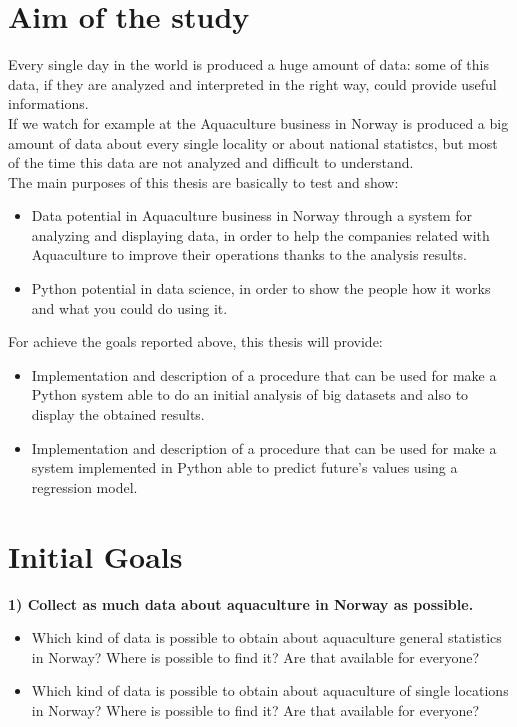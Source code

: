 


\section{Aim of the study}
Every single day in the world is produced a huge amount of data: some of this data, if they are analyzed and interpreted in the right way, could provide useful informations.\\
If we watch for example at the Aquaculture business in Norway is produced a big amount of data about every single locality or about national statistcs, but most of the time this data are not analyzed and difficult to understand.\\
The main purposes of this thesis are basically to test and show:
\begin{itemize} 
 \item 	Data potential in Aquaculture business in Norway through a system for analyzing and displaying data, in order to help the companies related with Aquaculture to improve their operations thanks to the analysis results.
 \item 	Python potential in data science, in order to show the people how it works and what you could do using it.
 \end{itemize}
For achieve the goals reported above, this thesis will provide:
\begin{itemize} 
 \item 	Implementation and description of a procedure that can be used for make a Python system able to do an initial analysis of  big datasets and also to display the obtained results.
 \item Implementation and description of a procedure that can be used for make a system implemented in Python able to predict future’s values using a regression model.
 
 \end{itemize}

\newpage
\section{Initial Goals}

\textbf{1) Collect as much data about aquaculture in Norway as possible.}
\vspace{-5mm}
\begin{itemize}
 \setlength{\itemsep}{-5pt}
  \item Which kind of data is possible to obtain about aquaculture general statistics in Norway? Where is possible to find it? Are that available for everyone?
  \item Which kind of data is possible to obtain about aquaculture of single locations in Norway? Where is possible to find it? Are that available for everyone?
\end{itemize}

